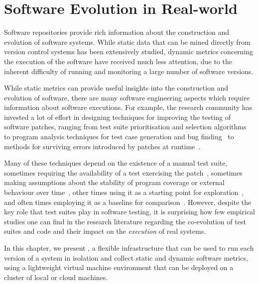 \chapter{Software Evolution in Real-world}
\label{chap:evolution}

Software repositories provide rich information about the
construction and evolution of software systems.  While static data
that can be mined directly from version control systems
has been extensively studied, dynamic metrics
concerning the execution of the software have received much less
attention, due to the inherent difficulty of running and monitoring
a large number of software versions.

While static metrics can provide useful insights into the construction
and evolution of software, there are many software engineering aspects
which require information about software executions.  For example, the
research community has invested a lot of effort in designing
techniques for improving the testing of software patches, ranging from
test suite prioritisation and selection
algorithms~\cite{harrold:test-redundancy,test-pri,Rothermel96analyzingregression}
to program analysis techniques for test case generation and bug
finding~\cite{diff-symex,directed-test-augmen:09,express,directed-symex11,babic11,directed-incr-symex11,patch:spin12,interaction-changes13}
to methods for surviving errors introduced by patches at
runtime~\cite{mx}.

Many of these techniques depend on the existence of a manual test
suite, sometimes requiring the availability of a test exercising the
patch~\cite{onlinevalidation,tachyon12}, sometimes making assumptions
about the stability of program coverage or external behaviour over
time~\cite{cov_regr97,mx}, other times using it as a starting point
for
exploration~\cite{zesti,pretex,sage,test-augmentation:genetic-vs-concolic},
and often times employing it as a baseline for
comparison~\cite{klee,dotnet-random-test08,semantic-fp-testing12,mutation-tests-oracle12}.
However, despite the key role that test suites play in software
testing, it is surprising how few empirical studies one can find in
the research literature regarding the co-evolution of test suites and
code and their impact on the \textit{execution} of real systems.

In this chapter, we present \covrig, a flexible infrastructure that can
be used to run each version of a system in isolation and collect
static and dynamic software metrics, using a lightweight virtual
machine environment that can be deployed on a cluster of local or
cloud machines.

